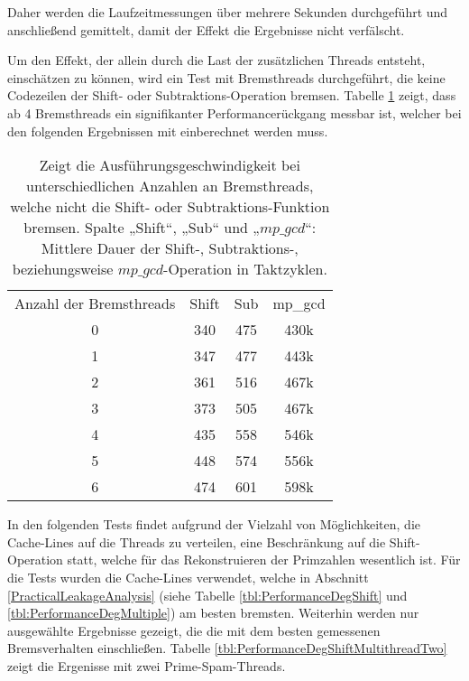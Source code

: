 Daher werden die Laufzeitmessungen über mehrere Sekunden durchgeführt und anschließend gemittelt, damit der Effekt die Ergebnisse nicht verfälscht.

Um den Effekt, der allein durch die Last der zusätzlichen Threads entsteht, einschätzen zu können, wird ein Test mit Bremsthreads durchgeführt, die keine Codezeilen der Shift- oder Subtraktions-Operation bremsen.
Tabelle \ref{tbl:PrimeSpamMultithreadRef} zeigt, dass ab 4 Bremsthreads ein signifikanter Performancerückgang messbar ist, welcher bei den folgenden Ergebnissen mit einberechnet werden muss.

\begin{table}[h]
\caption{Zeigt die Ausführungsgeschwindigkeit bei unterschiedlichen Anzahlen an Bremsthreads, welche nicht die Shift- oder Subtraktions-Funktion bremsen. Spalte „Shift“, „Sub“ und „$mp\_gcd$“: Mittlere Dauer der Shift-, Subtraktions-, beziehungsweise $mp\_gcd$-Operation in Taktzyklen.}
\label{tbl:PrimeSpamMultithreadRef}
\begin{tabular}{cccc}
Anzahl der Bremsthreads & Shift & Sub & mp\_gcd \\
0                      & 340   & 475 & 430k    \\
1                      & 347   & 477 & 443k    \\
2                      & 361   & 516 & 467k    \\
3                      & 373   & 505 & 467k    \\
4                      & 435   & 558 & 546k    \\
5                      & 448   & 574 & 556k    \\
6                      & 474   & 601 & 598k   
\end{tabular}
\end{table}

In den folgenden Tests findet aufgrund der Vielzahl von Möglichkeiten, die Cache-Lines auf die Threads zu verteilen, eine Beschränkung auf die Shift-Operation statt, welche für das Rekonstruieren der Primzahlen wesentlich ist.
Für die Tests wurden die Cache-Lines verwendet, welche in Abschnitt \ref{PracticalLeakageAnalysis} (siehe Tabelle \ref{tbl:PerformanceDegShift} und \ref{tbl:PerformanceDegMultiple}) am besten bremsten.
Weiterhin werden nur ausgewählte Ergebnisse gezeigt, die die mit dem besten gemessenen Bremsverhalten einschließen.
Tabelle \ref{tbl:PerformanceDegShiftMultithreadTwo} zeigt die Ergenisse mit zwei Prime-Spam-Threads.

